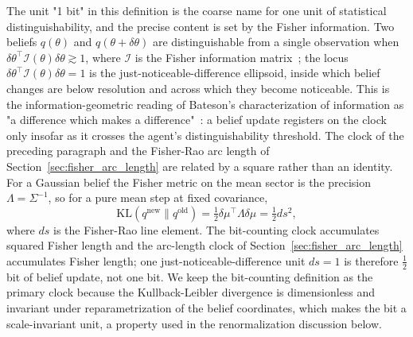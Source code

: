 The unit "1 bit" in this definition is the coarse name for one unit of statistical distinguishability, and the precise content is set by the Fisher information. Two beliefs $q(\theta)$ and $q(\theta + \delta\theta)$ are distinguishable from a single observation when $\delta\theta^\top \mathcal{I}(\theta)\delta\theta \gtrsim 1$, where $\mathcal{I}$ is the Fisher information matrix~\cite{CoverThomas2006, AmariNagaoka2000}; the locus $\delta\theta^\top \mathcal{I}(\theta)\delta\theta = 1$ is the just-noticeable-difference ellipsoid, inside which belief changes are below resolution and across which they become noticeable. This is the information-geometric reading of Bateson's characterization of information as "a difference which makes a difference"~\cite{Bateson1972}: a belief update registers on the clock only insofar as it crosses the agent's distinguishability threshold. The clock of the preceding paragraph and the Fisher-Rao arc length of Section~\ref{sec:fisher_arc_length} are related by a square rather than an identity. For a Gaussian belief the Fisher metric on the mean sector is the precision $\Lambda = \Sigma^{-1}$, so for a pure mean step at fixed covariance,
\begin{equation}
\mathrm{KL}(q^{\text{new}} \| q^{\text{old}}) = \tfrac{1}{2}\delta\mu^\top \Lambda \delta\mu = \tfrac{1}{2}ds^2,
\label{eq:kl_arclength}
\end{equation}
where $ds$ is the Fisher-Rao line element. The bit-counting clock accumulates squared Fisher length and the arc-length clock of Section~\ref{sec:fisher_arc_length} accumulates Fisher length; one just-noticeable-difference unit $ds = 1$ is therefore $\tfrac{1}{2}$ bit of belief update, not one bit. We keep the bit-counting definition as the primary clock because the Kullback-Leibler divergence is dimensionless and invariant under reparametrization of the belief coordinates, which makes the bit a scale-invariant unit, a property used in the renormalization discussion below.




